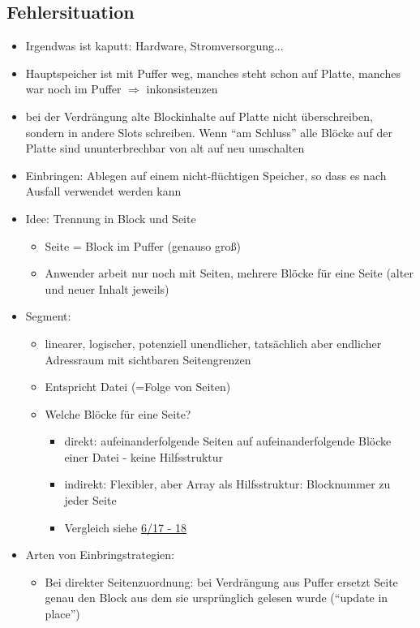 \documentclass[a4paper, 12pt]{scrartcl}
\begin{document}
\subsection{Fehlersituation}
\begin{itemize}
	\item
		Irgendwas ist kaputt: Hardware, Stromversorgung...
	\item
		Hauptspeicher ist mit Puffer weg, manches steht schon auf Platte, manches war noch im Puffer $\Rightarrow$ inkonsistenzen
	\item
		bei der Verdrängung alte Blockinhalte auf Platte nicht überschreiben, sondern in andere Slots schreiben. Wenn \enquote{am Schluss} alle Blöcke auf der Platte sind ununterbrechbar von alt auf neu umschalten
	\item
		Einbringen: Ablegen auf einem nicht-flüchtigen Speicher, so dass es nach Ausfall verwendet werden kann
	\item
		Idee: Trennung in Block und Seite
		\begin{itemize}
			\item
				Seite = Block im Puffer (genauso groß)
			\item
				Anwender arbeit nur noch mit Seiten, mehrere Blöcke für eine Seite (alter und neuer Inhalt jeweils)
		\end{itemize}
	\item Segment:
		\begin{itemize}
			\item
				linearer, logischer, potenziell unendlicher, tatsächlich aber endlicher Adressraum mit sichtbaren Seitengrenzen
			\item
				Entspricht Datei (=Folge von Seiten)
			\item
				Welche Blöcke für eine Seite?
				\begin{itemize}
					\item
						direkt: aufeinanderfolgende Seiten auf aufeinanderfolgende Blöcke einer Datei - keine Hilfsstruktur
					\item
						indirekt: Flexibler, aber Array als Hilfsstruktur: Blocknummer zu jeder Seite
					\item
						Vergleich siehe \href{site:IDB-2015WS-06-Puffer.pdf}{6/17 - 18}
				\end{itemize}
		\end{itemize}
	\item
		Arten von Einbringstrategien:
		\begin{itemize}
			\item
				Bei direkter Seitenzuordnung: bei Verdrängung aus Puffer ersetzt Seite genau den Block aus dem sie ursprünglich gelesen wurde (\enquote{update in place})

\end{itemize}
\end{itemize}
\end{document}
